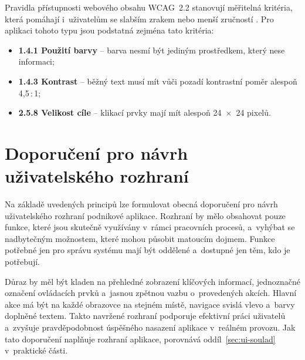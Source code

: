 Pravidla přístupnosti webového obsahu WCAG~2.2 stanovují měřitelná kritéria, která pomáhají i~uživatelům se slabším zrakem nebo menší zručností \cite{WCAG22}. Pro aplikaci tohoto typu jsou podstatná zejména tato kritéria:
\begin{itemize}
\item \textbf{1.4.1 Použití barvy} -- barva nesmí být jediným prostředkem, který nese informaci;
\item \textbf{1.4.3 Kontrast} -- běžný text musí mít vůči pozadí kontrastní poměr alespoň 4,5\,:\,1;
\item \textbf{2.5.8 Velikost cíle} -- klikací prvky mají mít alespoň 24~$\times$~24 pixelů.
\end{itemize}

\section{Doporučení pro návrh uživatelského rozhraní}\label{sec:ui-doporuceni}

Na základě uvedených principů lze formulovat obecná doporučení pro návrh uživatelského rozhraní podnikové aplikace. Rozhraní by mělo obsahovat pouze funkce, které jsou skutečně využívány v~rámci pracovních procesů, a~vyhýbat se nadbytečným možnostem, které mohou působit matoucím dojmem. Funkce potřebné jen pro správu systému mají být oddělené a~dostupné jen těm, kdo je potřebují.

Důraz by měl být kladen na přehledné zobrazení klíčových informací, jednoznačné označení ovládacích prvků a~jasnou zpětnou vazbu o~provedených akcích. Hlavní akce má být na každé obrazovce na stejném místě, navigace svislá vlevo a~barvy doplněné textem. Takto navržené rozhraní podporuje efektivní práci uživatelů a~zvyšuje pravděpodobnost úspěšného nasazení aplikace v~reálném provozu. Jak tato doporučení naplňuje rozhraní aplikace, porovnává oddíl~\ref{sec:ui-soulad} v~praktické části.
